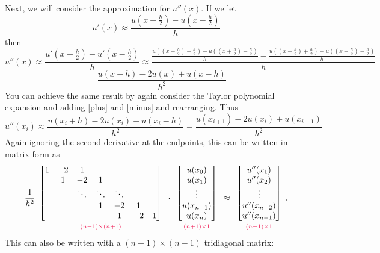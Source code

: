\noindent Next, we will consider the approximation for $u''(x)$.
If we let
\[u'(x) \approx \frac{u(x+\frac{h}{2})-u(x-\frac{h}{2})}{h}\]
then
\[u''(x) \approx \frac{u'(x+\frac{h}{2})-u'(x-\frac{h}{2})}{h} \approx \frac{\frac{u((x+\frac{h}{2})+\frac{h}{2})-u((x+\frac{h}{2})-\frac{h}{2})}{h}-\frac{u((x-\frac{h}{2})+\frac{h}{2})-u((x-\frac{h}{2})-\frac{h}{2})}{h}}{h}\]
\[= \frac{u(x+h) - 2u(x) + u(x-h)}{h^2}\]
You can achieve the same result by again consider the Taylor polynomial expansion and adding \eqref{plus} and \eqref{minus} and rearranging.
Thus
\[u''(x_i) \approx \frac{u(x_i+h) - 2u(x_i) + u(x_i-h)}{h^2}= \frac{u(x_{i+1}) - 2u(x_i) + u(x_{i-1})}{h^2}\]
Again ignoring the second derivative at the endpoints, this can be written in matrix form as
\begin{align}
\frac{1}{h^2}
\begin{array}{c}
\begin{bmatrix}
1 & -2 & 1 & \\
& 1 & -2 & 1  \\
& &\ddots &\ddots & \ddots  \\
& & & 1 & -2 & 1 \\
& & & & 1 & -2 & 1
\end{bmatrix}\\
{\scriptstyle\textcolor{red}{(n-1)\times(n+1)}}
\end{array}\cdot
\begin{array}{c}
\begin{bmatrix}
u(x_0) \\ u(x_1)\\ \vdots  \\ u(x_{n-1}) \\ u(x_n)
\end{bmatrix}\\
{\scriptstyle\textcolor{red}{(n+1)\times1}}
\end{array}
 \approx
 \begin{array}{c}
\begin{bmatrix}
u''(x_1) \\ u''(x_2)\\ \vdots  \\ u''(x_{n-2}) \\ u''(x_{n-1})
\end{bmatrix}\\
{\scriptstyle\textcolor{red}{(n-1)\times1}}
\label{finitedifference2:uppp}
\end{array}.
\end{align}
This can also be written with a $(n-1)\times(n-1)$ tridiagonal matrix:
